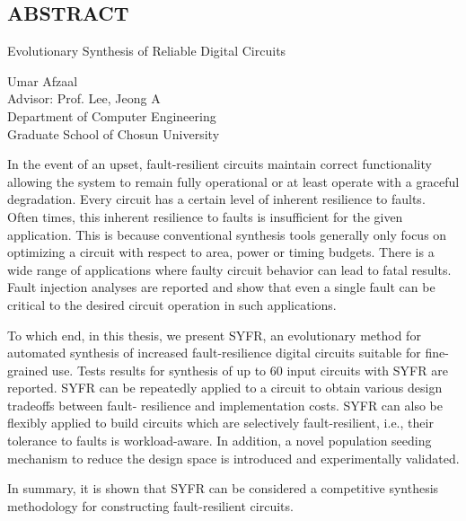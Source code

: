 \begin{center}
\section*{ABSTRACT}
\end{center}

\bigskip
\bigskip
\centerline{\large{Evolutionary Synthesis of Reliable Digital Circuits}}
\bigskip

\begin{flushright}
Umar Afzaal\\
Advisor: Prof. Lee, Jeong A\\
Department of Computer Engineering\\
Graduate School of Chosun University\\
\end{flushright}

In the event of an upset, fault-resilient circuits
maintain correct functionality allowing the system to remain fully
operational or at least operate with a graceful degradation. Every
circuit has a certain level of inherent resilience to faults. Often
times, this inherent resilience to faults is insufficient for the given
application. This is because conventional synthesis tools generally
only focus on optimizing a circuit with respect to area, power or
timing budgets. There is a wide range of applications where faulty
circuit behavior can lead to fatal results. Fault injection analyses
are reported and show that even a single fault can be critical to
the desired circuit operation in such applications.

To which end, in this thesis, we present SYFR, an evolutionary method
for automated synthesis of increased fault-resilience digital circuits
suitable for fine-grained use. Tests results for synthesis of up to 60
input circuits with SYFR are reported. SYFR can be repeatedly applied
to a circuit to obtain various design tradeoffs between fault-
resilience and implementation costs. SYFR can also be flexibly
applied to build circuits which are selectively fault-resilient,
i.e., their tolerance to faults is workload-aware. In addition, a
novel population seeding mechanism to reduce the design space
is introduced and experimentally validated.

In summary, it is shown that SYFR can be considered a competitive
synthesis methodology for constructing fault-resilient circuits.
